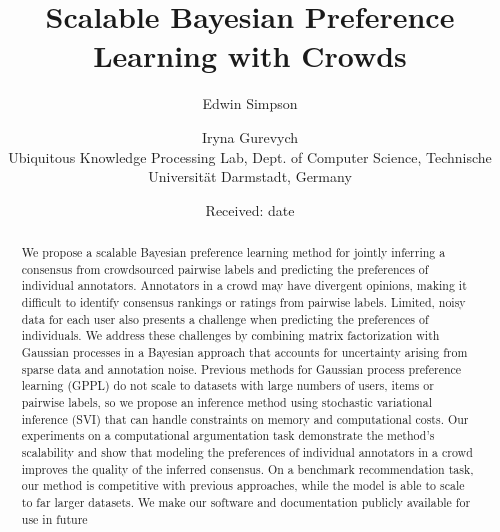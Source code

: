\documentclass[smallcondensed,natbib]{svjour3}     %
\title{ 
Scalable Bayesian Preference Learning with Crowds
}
\author{Edwin Simpson 
\and Iryna Gurevych \\
Ubiquitous Knowledge Processing Lab, Dept. of Computer Science, Technische Universit\"at Darmstadt, Germany\\
              \email{\{simpson,gurevych\}@ukp.informatik.tu-darmstadt.de}
}
\date{Received: date}
\begin{document}


\maketitle

\begin{abstract}
We propose a scalable Bayesian preference learning method 
for jointly inferring a consensus from crowdsourced pairwise labels 
and predicting the preferences of individual annotators.
Annotators in a crowd may have divergent opinions, making it difficult to identify consensus rankings or ratings from
pairwise labels. Limited, noisy data for each user also presents a challenge when predicting the preferences of individuals. 
We address these challenges by combining matrix factorization with 
Gaussian processes in a Bayesian approach that
accounts for uncertainty arising from sparse data and annotation noise.
Previous methods for Gaussian process preference learning (GPPL) do not scale to datasets with large numbers
 of users, items or pairwise labels, so we propose an inference method using stochastic variational inference (SVI)
that can handle constraints on memory and computational costs.
Our experiments on a computational argumentation task
demonstrate the method's scalability and
 show that modeling the preferences of individual annotators in a crowd improves the quality of
the inferred consensus.
On a benchmark recommendation task, our method is competitive with previous approaches, 
 while the model is able to scale to far larger datasets.
We make our software and documentation publicly available for use in future 

\end{abstract}
\end{document}
